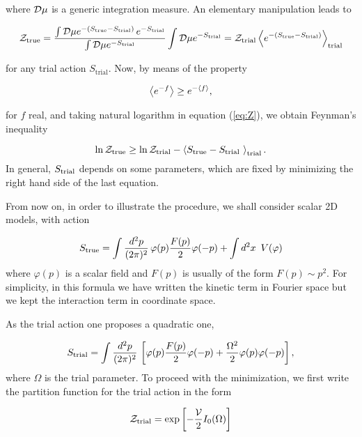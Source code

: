 \documentclass[a4paper,12pt]{article}
\begin{document}
\noindent where $\mathcal{D}\mu$ is a generic integration measure. An elementary manipulation
leads to

\begin{equation}\label{eq:Z}
\mathcal{Z}_{\text{true}}=\frac{\int\mathcal{D}\mu
e^{-(S_{\text{true}}-S_{\text{trial}})}\,e^{-S_{\text{trial}}}}{\int\mathcal{D}\mu
e^{-S_{\text{trial}}}}\int\mathcal{D}\mu e^{-S_{\text{trial}}}=\mathcal{Z}_{\text{trial}}\left\langle
e^{-(S_{\text{true}}-S_{\text{trial}})} \right\rangle_{\text{trial}}
\end{equation}

\noindent for any trial action $S_{\text{trial}}$. Now, by means of the property

\begin{equation}
\left\langle e^{-f} \right\rangle\geq e^{-\left\langle f \right\rangle},
\end{equation}

\noindent for $f$ real, and taking natural logarithm in equation
(\ref{eq:Z}), we obtain Feynman's inequality \cite{Feynman}

\begin{equation}\label{Feynman}
\ln\mathcal{Z}_{\text{true}}\geq \ln\mathcal{Z}_{\text{trial}} - \left\langle S_{\text{true}}-S_{\text{trial}}\ \right\rangle_{\text{trial}}.
\end{equation}
In general, $S_{\text{trial}}$ depends on some parameters, which are fixed
by minimizing the right hand side of the last equation.

From now on, in order to illustrate the procedure, we shall consider scalar 2D models,
with action

\begin{equation}
S_{\text{true}}=\int\frac{d^2p}{(2\pi)^2}\,\varphi(p)\frac{F(p)}{2}\varphi(-p) + \int d^2x\,\
V(\varphi)
\end{equation}
where $\varphi(p)$ is a scalar field and $F(p)$ is usually of the form $F(p)\sim p^2$.
For simplicity, in this formula we have written the kinetic term in Fourier space but
we kept the interaction term in coordinate space.

As the trial action one proposes a quadratic one,

\begin{equation}
S_{\text{trial}}=\int\frac{d^2p}{(2\pi)^2}\,\left[\varphi(p)\frac{F(p)}{2}\varphi(-p) +
\frac{\Omega^2}{2}\varphi(p)\varphi(-p)\right],
\end{equation}
where $\Omega$ is the trial parameter. To proceed with the
minimization, we first write the partition function for the trial
action in the form

\begin{equation}\label{ztrial}
\mathcal{Z}_{\text{trial}}=\exp{\left[-\frac{\mathcal{V}}{2} I_0(\Omega)\right]}
\end{equation}
\end{document}
